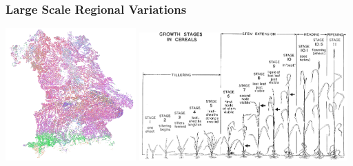 \begin{frame}
\frametitle{Large Scale Regional Variations}

\includegraphics[width=5cm]{images/Bavaria}
\includegraphics[width=8cm]{images/Large1954_cerial_growth_stages.png}

\end{frame}

